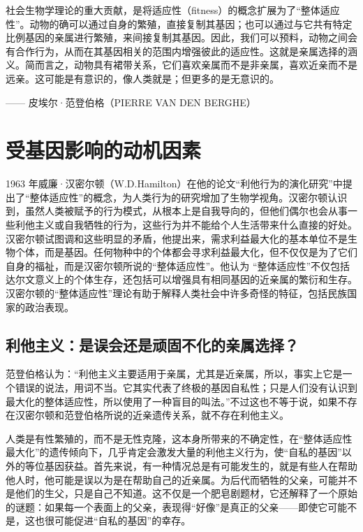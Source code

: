 \begin{tcolorbox}
\kaishu 社会生物学理论的重大贡献，是将适应性（fitness）的概念扩展为了“整体适应性”。动物的确可以通过自身的繁殖，直接复制其基因；也可以通过与它共有特定比例基因的亲属进行繁殖，来间接复制其基因。因此，我们可以预料，动物之间会有合作行为，从而在其基因相关的范围内增强彼此的适应性。这就是亲属选择的涵义。简而言之，动物具有裙带关系，它们喜欢亲属而不是非亲属，喜欢近亲而不是远亲。这可能是有意识的，像人类就是；但更多的是无意识的。
\begin{flushright}
—— 皮埃尔·范登伯格（PIERRE VAN DEN BERGHE） 
\end{flushright}
\end{tcolorbox}


\section{受基因影响的动机因素}

1963 年威廉·汉密尔顿（W.D.Hamilton）在他的论文“利他行为的演化研究”中提出了“整体适应性”的概念，为人类行为的研究增加了生物学视角。汉密尔顿认识到，虽然人类被赋予的行为模式，从根本上是自我导向的，但他们偶尔也会从事一些利他主义或自我牺牲的行为，这些行为并不能给个人生活带来什么直接的好处。汉密尔顿试图调和这些明显的矛盾，他提出来，需求利益最大化的基本单位不是生物个体，而是基因。任何物种中的个体都会寻求利益最大化，但不仅仅是为了它们自身的福祉，而是汉密尔顿所说的“整体适应性”。他认为 “整体适应性”不仅包括达尔文意义上的个体生存，还包括可以增强具有相同基因的近亲属的繁衍和生存。汉密尔顿的“整体适应性”理论有助于解释人类社会中许多奇怪的特征，包括民族国家的政治表现。

\subsection{利他主义：是误会还是顽固不化的亲属选择？}

范登伯格认为：“利他主义主要适用于亲属，尤其是近亲属，所以，事实上它是一个错误的说法，用词不当。它其实代表了终极的基因自私性；只是人们没有认识到最大化的整体适应性，所以使用了一种盲目的叫法。”不过这也不等于说，如果不存在汉密尔顿和范登伯格所说的近亲遗传关系，就不存在利他主义。

人类是有性繁殖的，而不是无性克隆，这本身所带来的不确定性，在“整体适应性最大化”的遗传倾向下，几乎肯定会激发大量的利他主义行为，使“自私的基因”以外的等位基因获益。首先来说，有一种情况总是有可能发生的，就是有些人在帮助他人时，他可能是误以为是在帮助自己的近亲属。为后代而牺牲的父亲，可能并不是他们的生父，只是自己不知道。这不仅是一个肥皂剧题材，它还解释了一个原始的谜题：如果每一个表面上的父亲，表现得“好像”是真正的父亲——即使它可能不是，这也很可能促进“自私的基因”的幸存。

